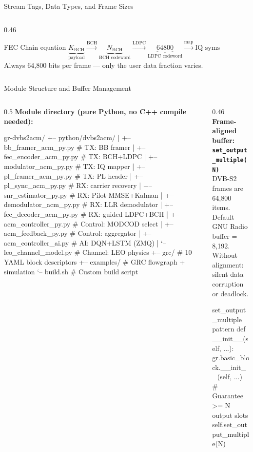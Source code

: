 \documentclass[aspectratio=169,10pt]{beamer}
\begin{document}
\begin{frame}{Stream Tags, Data Types, and Frame Sizes}
\begin{columns}[T]
\begin{column}{0.46\textwidth}
      \vspace{0.3em}
      \begin{conceptbox}{FEC Chain equation}
        \scriptsize $\underbrace{K_\text{BCH}}_\text{payload}
        \xrightarrow{\text{BCH}} \underbrace{N_\text{BCH}}_\text{BCH codeword}
        \xrightarrow{\text{LDPC}} \underbrace{64800}_\text{LDPC codeword}
        \xrightarrow{\text{map}} \text{IQ syms}$\\[3pt]
        Always 64,800 bits per frame — only the user data fraction varies.
      \end{conceptbox}
    \end{column}
  \end{columns}
\end{frame}


\begin{frame}[fragile,shrink=22]{Module Structure and Buffer Management}
  \begin{columns}[T]
    \begin{column}{0.5\textwidth}
      \textbf{Module directory (pure Python, no C++ compile needed):}
\begin{terminal}
gr-dvbs2acm/
+-- python/dvbs2acm/
|   +-- bb_framer_acm_py.py    # TX: BB framer
|   +-- fec_encoder_acm_py.py  # TX: BCH+LDPC
|   +-- modulator_acm_py.py    # TX: IQ mapper
|   +-- pl_framer_acm_py.py    # TX: PL header
|   +-- pl_sync_acm_py.py      # RX: carrier recovery
|   +-- snr_estimator_py.py    # RX: Pilot-MMSE+Kalman
|   +-- demodulator_acm_py.py  # RX: LLR demodulator
|   +-- fec_decoder_acm_py.py  # RX: guided LDPC+BCH
|   +-- acm_controller_py.py   # Control: MODCOD select
|   +-- acm_feedback_py.py     # Control: aggregator
|   +-- acm_controller_ai.py   # AI: DQN+LSTM (ZMQ)
|   `-- leo_channel_model.py   # Channel: LEO physics
+-- grc/                       # 10 YAML block descriptors
+-- examples/                  # GRC flowgraph + simulation
`-- build.sh                   # Custom build script
\end{terminal}
    \end{column}
    \begin{column}{0.46\textwidth}
      \textbf{Frame-aligned buffer: \texttt{set\_output\_multiple(N)}}\\
      \scriptsize DVB-S2 frames are 64,800 items. Default GNU Radio buffer = 8,192.
      Without alignment: silent data corruption or deadlock.
\begin{codeblock}{set\_output\_multiple pattern}
def __init__(self, ...):
    gr.basic_block.__init__(self, ...)
    # Guarantee >= N output slots
    self.set_output_multiple(N)


\end{codeblock}
\end{column}
\end{columns}
\end{frame}
\end{document}
